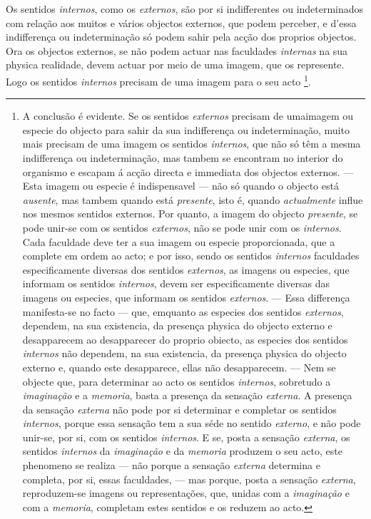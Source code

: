 Os sentidos \emph{internos}, como os \emph{externos}, são por si indifferentes ou indeterminados com relação aos muitos e vários objectos externos, que podem perceber, e d'essa indifferença ou indeterminação só podem sahir pela acção dos proprios objectos. Ora os objectos externos, se não podem actuar nas faculdades \emph{internas} na sua physica realidade, devem actuar por meio de uma imagem, que os represente. Logo os sentidos \emph{internos} precisam de uma imagem para o seu acto \footnote{A conclusão é evidente. Se os sentidos \emph{externos} precisam de umaimagem ou especie do objecto para sahir da sua indifferença ou indeterminação, muito mais precisam de uma imagem os sentidos \emph{internos}, que não só têm a mesma indifferença ou indeterminação, mas tambem se encontram no interior do organismo e escapam á acção directa e immediata dos objectos externos. --- Esta imagem ou especie é indispensavel --- não só quando o objecto está \emph{ausente}, mas tambem quando está \emph{presente}, isto é, quando \emph{actualmente} influe nos mesmos sentidos externos. Por quanto, a imagem do objecto \emph{presente}, se pode unir-se com os sentidos \emph{externos}, não se pode unir com os \emph{internos}. Cada faculdade deve ter a sua imagem ou especie proporcionada, que a complete em ordem ao acto; e por isso, sendo os sentidos \emph{internos} faculdades especificamente diversas dos sentidos \emph{externos}, as imagens ou especies, que informam os sentidos \emph{internos}, devem ser especificamente diversas das imagens ou especies, que informam os sentidos \emph{externos}. --- Essa differença manifesta-se no facto --- que, emquanto as especies dos sentidos \emph{externos}, dependem, na sua existencia, da presença physica do objecto externo e desapparecem ao desapparecer do proprio obiecto, as especies dos sentidos \emph{internos} não dependem, na sua existencia, da presença physica do objecto externo e, quando este desapparece, ellas não desapparecem. --- Nem se objecte que, para determinar ao acto os sentidos \emph{internos}, sobretudo a \emph{imaginação} e a \emph{memoria}, basta a presença da sensação \emph{externa}. A presença da sensação \emph{externa} não pode por si determinar e completar os sentidos \emph{internos}, porque essa sensação tem a sua séde no sentido \emph{externo}, e não pode unir-se, por si, com os sentidos \emph{internos}. E se, posta a sensação \emph{externa}, os sentidos \emph{internos} da \emph{imaginação} e da \emph{memoria} produzem o seu acto, este phenomeno se realiza --- não porque a sensação \emph{externa} determina e completa, por si, essas faculdades, --- mas porque, posta a sensação \emph{externa}, reproduzem-se imagens ou representações, que, unidas com a \emph{imaginação} e com a \emph{memoria}, completam estes sentidos e os reduzem ao acto.}.

